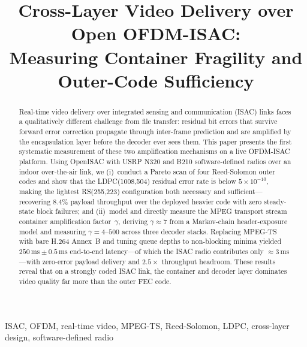 \documentclass[conference]{IEEEtran}
\begin{document}
\title{Cross-Layer Video Delivery over Open OFDM-ISAC:\\
Measuring Container Fragility and Outer-Code Sufficiency}

\author{
}

\maketitle

\begin{abstract}
Real-time video delivery over integrated sensing and communication (ISAC) links faces a qualitatively different challenge from file transfer: residual bit errors that survive forward error correction propagate through inter-frame prediction and are amplified by the encapsulation layer before the decoder ever sees them. This paper presents the first systematic measurement of these two amplification mechanisms on a live OFDM-ISAC platform. Using OpenISAC with USRP N320 and B210 software-defined radios over an indoor over-the-air link, we (i)~conduct a Pareto scan of four Reed-Solomon outer codes and show that the LDPC(1008,504) residual error rate is below $5\times10^{-10}$, making the lightest RS(255,223) configuration both necessary and sufficient---recovering 8.4\% payload throughput over the deployed heavier code with zero steady-state block failures; and (ii)~model and directly measure the MPEG transport stream container amplification factor~$\gamma$, deriving $\gamma\approx 7$ from a Markov-chain header-exposure model and measuring $\gamma=4$--$500$ across three decoder stacks. Replacing MPEG-TS with bare H.264 Annex~B and tuning queue depths to non-blocking minima yielded $250\,\text{ms} \pm 0.5\,\text{ms}$ end-to-end latency---of which the ISAC radio contributes only $\approx\!3\,\text{ms}$---with zero-error payload delivery and $2.5\times$ throughput headroom. These results reveal that on a strongly coded ISAC link, the container and decoder layer dominates video quality far more than the outer FEC code.
\end{abstract}

\begin{IEEEkeywords}
ISAC, OFDM, real-time video, MPEG-TS, Reed-Solomon, LDPC, cross-layer design, software-defined radio
\end{IEEEkeywords}
\end{document}
